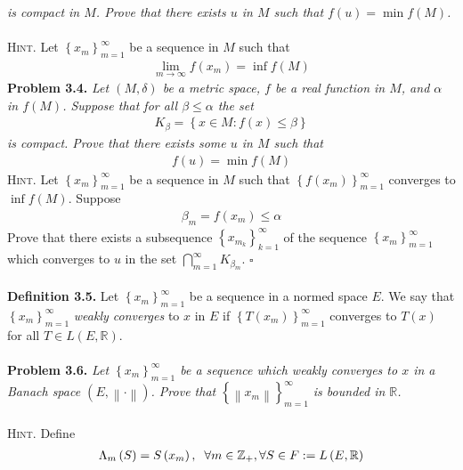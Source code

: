 \documentclass[a4paper]{article}
\numberwithin{equation}{section}
\begin{document}
\textit{is compact in $M$. Prove that there exists $u$ in $M$ such that $f\left(u\right)=\min f\left(M\right)$.}\\
\\
\textsc{Hint.} Let $\left\{ {{x_m}} \right\}_{m = 1}^\infty $ 
be a sequence in $M$ such that
\begin{align}
\mathop {\lim }\limits_{m \to \infty } f\left( {{x_m}} \right) = \inf f\left( M \right)
\end{align}
\textbf{Problem 3.4.} \textit{Let $\left( {M,\delta } \right)$ be a metric space, $f$ be a real function in $M$, and $\alpha$ in $f\left(M\right)$. Suppose that for all $\beta \le \alpha$ the set}
\begin{align}
{K_\beta } = \left\{ {x \in M:f\left( x \right) \le \beta } \right\}
\end{align}
\textit{is compact. Prove that there exists some $u$ in $M$ such that}
\begin{align}
f\left( u \right) = \min f\left( M \right)
\end{align}
\textsc{Hint.} Let $\left\{ {{x_m}} \right\}_{m = 1}^\infty $ 
be a sequence in $M$ such that $\left\{ {f\left( {{x_m}} \right)} \right\}_{m = 1}^\infty $ converges to $\inf f\left( M \right)$. Suppose 
\begin{align}
{\beta _m} = f\left( {{x_m}} \right) \le \alpha 
\end{align}
Prove that there exists a subsequence $\left\{ {{x_{{m_k}}}} \right\}_{k = 1}^\infty $ of the sequence $\left\{ {{x_m}} \right\}_{m = 1}^\infty $ which converges to $u$ in the set $\bigcap\limits_{m = 1}^\infty  {{K_{{\beta _m}}}} $. \hfill $\square$\\
\\
\textbf{Definition 3.5.} Let $\left\{ {{x_m}} \right\}_{m = 1}^\infty $ be a sequence in a normed space $E$. We say that $\left\{ {{x_m}} \right\}_{m = 1}^\infty $\textit{ weakly converges} to $x$ in $E$ if $\left\{ {T\left( {{x_m}} \right)} \right\}_{m = 1}^\infty $ converges to $T\left(x\right)$ for all $T \in L\left(E,\mathbb{R}\right)$.\\
\\
\textbf{Problem 3.6.} \textit{Let $\left\{ {{x_m}} \right\}_{m = 1}^\infty $ be a sequence which weakly converges to $x$ in a Banach space $\left( {E,\left\|  \cdot  \right\|} \right)$. Prove that $\left\{ {\left\| {{x_m}} \right\|} \right\}_{m = 1}^\infty $ is bounded in $\mathbb{R}$.}\\
\\
\textsc{Hint.} Define 
\begin{align}
{\Lambda _m}\left( S \right) = S\left( {{x_m}} \right),\hspace{0.2cm}\forall m \in {\mathbb{Z}_ + },\forall S \in F: = L\left( {E,\mathbb{R}} \right)
\end{align}
\end{document}
